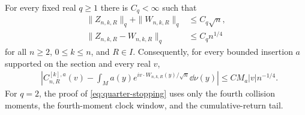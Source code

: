 \begin{theorem}
\label{thm:multiscale-marked-stopping}
For every fixed real $q\ge1$ there is $C_q<\infty$ such that
\begin{align}
 \|Z_{n,k,R}\|_q+\|W_{n,k,R}\|_q&\le C_q\sqrt n,
       \label{eq:all-stopped-moment-bound}\\
 \|Z_{n,k,R}-W_{n,k,R}\|_q&\le C_q n^{1/4}
       \label{eq:quarter-stopping}
\end{align}
for all $n\ge2$, $0\le k\le n$, and $R\in I$. Consequently, for every
bounded insertion $a$ supported on the section and every real $v$,
\begin{align}
 &\left|C^{[k],a}_{n,R}(v)
   -\int_M a(y)e^{iv\cdot W_{n,k,R}(y)/\sqrt n}\dd\nu(y)\right|
       \le CM_a|v|n^{-1/4}.
       \label{eq:quarter-characteristic-stopping}
\end{align}
For $q=2$, the proof of \eqref{eq:quarter-stopping} uses only the
fourth collision moments, the fourth-moment clock window, and the
cumulative-return tail.
\end{theorem}

